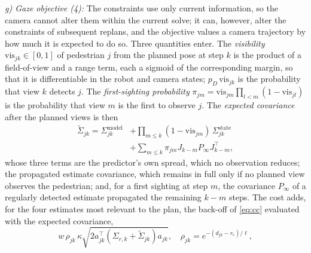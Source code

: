 \documentclass[letterpaper, 10 pt, conference]{ieeeconf}
\begin{document}
\textit{g) Gaze objective (4):} The constraints use only current information, so the camera cannot alter them within the current solve; it can, however, alter the constraints of subsequent replans, and the objective values a camera trajectory by how much it is expected to do so. Three quantities enter. The \emph{visibility} $\mathrm{vis}_{jk}\in[0,1]$ of pedestrian $j$ from the planned pose at step $k$ is the product of a field-of-view and a range term, each a sigmoid of the corresponding margin, so that it is differentiable in the robot and camera states; $p_D\,\mathrm{vis}_{jk}$ is the probability that view $k$ detects $j$. The \emph{first-sighting probability} $\pi_{jm} = \mathrm{vis}_{jm}\prod_{l<m}(1-\mathrm{vis}_{jl})$ is the probability that view $m$ is the first to observe $j$. The \emph{expected covariance} after the planned views is then
\begin{equation}
\begin{aligned}
\tilde\Sigma_{jk} = \Sigma^\text{model}_{jk} &+ \textstyle\prod_{m\le k}(1-\mathrm{vis}_{jm})\,\Sigma^\text{state}_{jk}\\
&+ \textstyle\sum_{m\le k}\pi_{jm} J_{k-m}P_\infty J_{k-m}^\top,
\end{aligned}
\label{eq:exp}
\end{equation}
whose three terms are the predictor's own spread, which no observation reduces; the propagated estimate covariance, which remains in full only if no planned view observes the pedestrian; and, for a first sighting at step $m$, the covariance $P_\infty$ of a regularly detected estimate propagated the remaining $k-m$ steps. The cost adds, for the four estimates most relevant to the plan, the back-off of \eqref{eq:cc} evaluated with the expected covariance,
\begin{equation}
w\,\rho_{jk}\,\kappa\sqrt{2a_{jk}^\top(\Sigma_{r,k}+\tilde\Sigma_{jk})a_{jk}},\quad \rho_{jk} = e^{-(d_{jk}-r_\text{c})/\ell},
\label{eq:gaze}
\end{equation}
\end{document}
